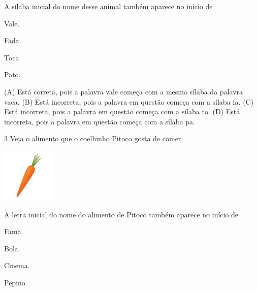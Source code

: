 
A sílaba inicial do nome desse animal também aparece no início de

\begin{minipage}{.5\textwidth}
\begin{escolha}
\item Vale.

\item Fada.

\item Toca

\item Pato.
\end{escolha}
\end{minipage}

(A) Está correta, pois a palavra vale começa com a mesma sílaba da palavra vaca.
(B) Está incorreta, pois a palavra em questão começa com a sílaba fa.
(C) Está incorreta, pois a palavra em questão começa com a sílaba to.
(D) Está incorreta, pois a palavra em questão começa com a sílaba pa.

\num{3} Veja o alimento que o coelhinho Pitoco gosta de comer.

\includegraphics[width=1.01111in,height=1.01111in]{media/image149.jpeg}


A letra inicial do nome do alimento de Pitoco também aparece no início de

\begin{minipage}{.5\textwidth}
\begin{escolha}
\item Fama.

\item Bola.

\item Cinema.

\item Pepino.
\end{escolha}
\end{minipage}

